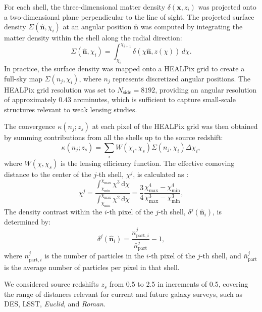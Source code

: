 For each shell, the three-dimensional matter density $\delta(\mathbf{x}, z_i)$ was projected onto a two-dimensional plane perpendicular to the line of sight. The projected surface density $\Sigma(\hat{\mathbf{n}}, \chi_i)$ at an angular position $\hat{\mathbf{n}}$ was computed by integrating the matter density within the shell along the radial direction:
\begin{equation}
    \Sigma(\hat{\mathbf{n}}, \chi_i) = \int_{\chi_i}^{\chi_{i+1}} \delta(\chi \hat{\mathbf{n}}, z(\chi)) \, d\chi.
\end{equation}
In practice, the surface density was mapped onto a HEALPix grid \citep{Górski_2005} to create a full-sky map $\Sigma(n_j, \chi_i)$, where $n_j$ represents discretized angular positions. The HEALPix grid resolution was set to $N_{\text{side}} = 8192$, providing an angular resolution of approximately $0.43$ arcminutes, which is sufficient to capture small-scale structures relevant to weak lensing studies.

The convergence $\kappa(n_j; z_s)$ at each pixel of the HEALPix grid was then obtained by summing contributions from all the shells up to the source redshift:
\begin{equation}
    \kappa(n_j; z_s) = \sum_{i} W(\chi_i, \chi_s) \Sigma(n_j, \chi_i) \Delta \chi_i,
\end{equation}
where $W(\chi, \chi_s)$ is the lensing efficiency function.
The effective comoving distance to the center of the $j$-th shell, $\chi^j$, is calculated as \citep{2015MNRAS.453.3043S}:
\begin{equation}
    \chi^j = \frac{\int_{\chi_{\min}}^{\chi_{\max}} \chi^3 \, \mathrm{d}\chi}{\int_{\chi_{\min}}^{\chi_{\max}} \chi^2 \, \mathrm{d}\chi} = \frac{3}{4} \frac{\chi_{\max}^4 - \chi_{\min}^4}{\chi_{\max}^3 - \chi_{\min}^3},
\end{equation}
The density contrast within the $i$-th pixel of the $j$-th shell, $\delta^j(\hat{\boldsymbol{n}}_i)$, is determined by:
\begin{equation}
    \delta^j(\hat{\boldsymbol{n}}_i) = \frac{n_{\mathrm{part}, i}^j}{\bar{n}_{\mathrm{part}}^j} - 1,
\end{equation}
where $n_{\mathrm{part}, i}^j$ is the number of particles in the $i$-th pixel of the $j$-th shell, and $\bar{n}_{\mathrm{part}}^j$ is the average number of particles per pixel in that shell.

We considered source redshifts $z_s$ from 0.5 to 2.5 in increments of 0.5, covering the range of distances relevant for current and future galaxy surveys, such as DES, LSST, \textit{Euclid}, and \textit{Roman}.

